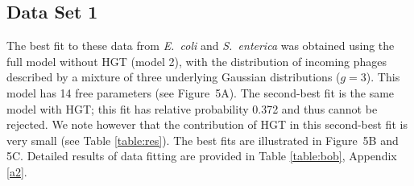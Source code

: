 \subsection{Data Set 1}
 The best fit to these data from {\it E.~coli} and {\it S.~enterica} was obtained using the full model without HGT (model 2), with the distribution of incoming phages described by a mixture of three underlying Gaussian distributions ($g=3$).  This model has 14 free parameters (see Figure~5A). The second-best fit is the same model with HGT; this fit has relative probability 0.372 and thus cannot be rejected.  We note however that the contribution of HGT in this second-best fit is very small (see Table \ref{table:res}).  The best fits are illustrated in Figure~5B and 5C. Detailed results of data fitting are provided in
Table \ref{table:bob}, Appendix \ref{a2}.
